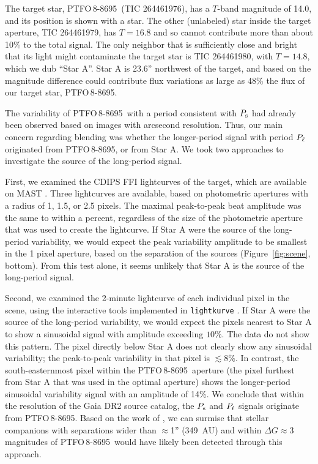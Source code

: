 \documentclass[12pt,twocolumn,tighten]{aastex62}
\newcommand{\ptfo}{PTFO$\,$8-8695}
\begin{document}
The target star, \ptfo\ (TIC 264461976), has a $T$-band magnitude of
14.0, and its position is shown with a star.  The other (unlabeled)
star inside the target aperture, TIC 264461979, has $T=16.8$ and so
cannot contribute more than about 10\% to the total signal.  The only
neighbor that is sufficiently close and bright that its light might
contaminate the target star is TIC 264461980, with $T=14.8$, which we
dub ``Star A''.  Star A is 23.6'' northwest of the target, and based
on the magnitude difference could contribute flux variations as large
as 48\% the flux of our target star, \ptfo.  

The variability of \ptfo\ with a period consistent with $P_{\rm s}$
had already been observed based on images with arcsecond resolution.
Thus, our main concern regarding blending was whether the
longer-period signal with period $P_{\rm \ell}$ originated from \ptfo,
or from Star A. We took two approaches to investigate the source of
the long-period signal.

First, we examined the CDIPS FFI lightcurves of the target, which are
available on MAST \citep{bouma_cluster_2019}. Three lightcurves are
available, based on photometric apertures with a radius of 1, 1.5, or
2.5 pixels. The maximal peak-to-peak beat amplitude was the same to
within a percent, regardless of the size of the photometric aperture
that was used to create the lightcurve.  If Star A were the source of
the long-period variability, we would expect the peak variability
amplitude to be smallest in the 1 pixel aperture, based on the
separation of the sources (Figure~\ref{fig:scene}, bottom).  From this
test alone, it seems unlikely that Star A is the source of the
long-period signal.

Second, we examined the 2-minute lightcurve of each individual pixel
in the scene, using the interactive tools implemented in
\texttt{lightkurve} \citep{lightkurve_2018}.  If Star A were the
source of the long-period variability, we would expect the pixels
nearest to Star A to show a sinusoidal signal with amplitude exceeding
$10\%$.  The data do not show this pattern.  The pixel directly below
Star A does not clearly show any sinusoidal variability; the
peak-to-peak variability in that pixel is $\lesssim 8\%$.  In
contrast, the south-easternmost pixel within the \ptfo\ aperture (the
pixel furthest from Star A that was used in the optimal aperture)
shows the longer-period sinusoidal variability signal with an
amplitude of 14\%.  We conclude that within the resolution of the Gaia
DR2 source catalog, the $P_{\rm s}$ and $P_{\rm \ell}$ signals
originate from \ptfo.  Based on the work of
\citet{ziegler_measuring_2018}, we can surmise that stellar companions
with separations wider than $\approx$1'' (349~AU) and within $\Delta G
\approx 3$ magnitudes of \ptfo\ would have likely been detected
through this approach. 
\end{document}
